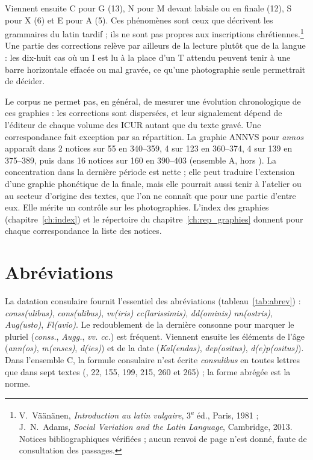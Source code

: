 Viennent ensuite C pour G (13), N pour M devant labiale ou en finale (12), S pour X (6) et E pour A (5). Ces phénomènes sont ceux que décrivent les grammaires du latin tardif ; ils ne sont pas propres aux inscriptions chrétiennes.\footnote{V.~Väänänen, \emph{Introduction au latin vulgaire}, 3\textsuperscript{e} éd., Paris, 1981 ; J.~N.~Adams, \emph{Social Variation and the Latin Language}, Cambridge, 2013. Notices bibliographiques vérifiées ; aucun renvoi de page n’est donné, faute de consultation des passages.} Une partie des corrections relève par ailleurs de la lecture plutôt que de la langue : les dix-huit cas où un I est lu à la place d’un T attendu peuvent tenir à une barre horizontale effacée ou mal gravée, ce qu’une photographie seule permettrait de décider.



Le corpus ne permet pas, en général, de mesurer une évolution chronologique de ces graphies : les corrections sont dispersées, et leur signalement dépend de l’éditeur de chaque volume des ICUR autant que du texte gravé. Une correspondance fait exception par sa répartition. La graphie ANNVS pour \emph{annos} apparaît dans 2 notices sur 55 en 340–359, 4 sur 123 en 360–374, 4 sur 139 en 375–389, puis dans 16 notices sur 160 en 390–403 (ensemble A, hors ). La concentration dans la dernière période est nette ; elle peut traduire l’extension d’une graphie phonétique de la finale, mais elle pourrait aussi tenir à l’atelier ou au secteur d’origine des textes, que l’on ne connaît que pour une partie d’entre eux. Elle mérite un contrôle sur les photographies. L’index des graphies (chapitre~\ref{ch:index}) et le répertoire du chapitre~\ref{ch:rep_graphies} donnent pour chaque correspondance la liste des notices.

\section{Abréviations}

La datation consulaire fournit l’essentiel des abréviations (tableau~\ref{tab:abrev}) : \emph{conss(ulibus)}, \emph{cons(ulibus)}, \emph{vv(iris) cc(larissimis)}, \emph{dd(ominis) nn(ostris)}, \emph{Aug(usto)}, \emph{Fl(avio)}. Le redoublement de la dernière consonne pour marquer le pluriel (\emph{conss.}, \emph{Augg.}, \emph{vv. cc.}) est fréquent. Viennent ensuite les éléments de l’âge (\emph{ann(os)}, \emph{m(enses)}, \emph{d(ies)}) et de la date (\emph{Kal(endas)}, \emph{dep(ositus)}, \emph{d(e)p(ositus)}). Dans l’ensemble C, la formule consulaire n’est écrite \emph{consulibus} en toutes lettres que dans sept textes (, 22, 155, 199, 215, 260 et 265) ; la forme abrégée est la norme.

